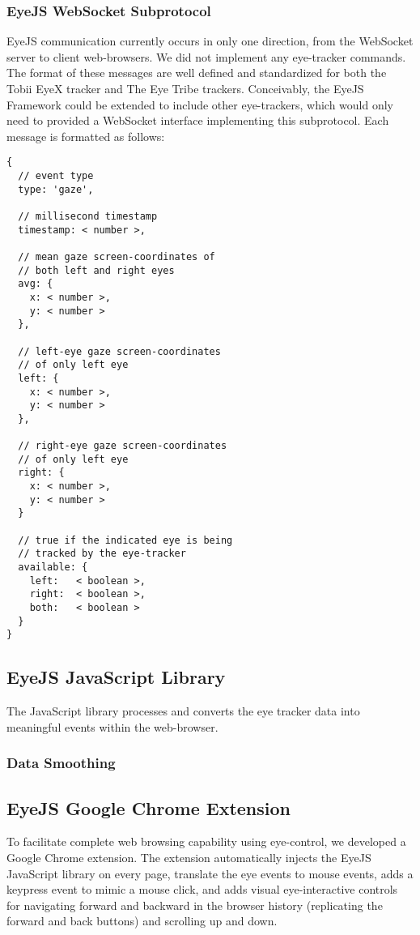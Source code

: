 \documentclass{sigchi}
\begin{document}
\subsubsection{EyeJS WebSocket Subprotocol}
EyeJS communication currently occurs in only one direction, from
the WebSocket server to client web-browsers. We did not implement
any eye-tracker commands. The format of these messages are well
defined and standardized
for both the Tobii EyeX tracker and The Eye Tribe trackers. Conceivably,
the EyeJS Framework could be extended to include other eye-trackers,
which would only need to provided a WebSocket interface implementing
this subprotocol. Each message is formatted as follows:

\begin{lstlisting}
{
  // event type
  type: 'gaze',

  // millisecond timestamp
  timestamp: < number >,

  // mean gaze screen-coordinates of
  // both left and right eyes
  avg: {
    x: < number >,
    y: < number >
  },

  // left-eye gaze screen-coordinates
  // of only left eye
  left: {
    x: < number >,
    y: < number >
  },

  // right-eye gaze screen-coordinates
  // of only left eye
  right: {
    x: < number >,
    y: < number >
  }

  // true if the indicated eye is being
  // tracked by the eye-tracker
  available: {
    left:   < boolean >,
    right:  < boolean >,
    both:   < boolean >
  }
}
\end{lstlisting}


\subsection{EyeJS JavaScript Library}
The JavaScript library processes and converts the eye tracker data
into meaningful events within the web-browser.

\subsubsection{Data Smoothing}

\subsubsection{}

\subsection{EyeJS Google Chrome Extension}
To facilitate complete web browsing capability using eye-control, we 
developed a Google Chrome extension. The extension automatically injects
the EyeJS JavaScript library on every page, translate the eye events to 
mouse events, adds a keypress event to mimic a mouse click, and adds 
visual eye-interactive controls for navigating forward and backward in
the browser history (replicating the forward and back buttons) and 
scrolling up and down.
\end{document}

